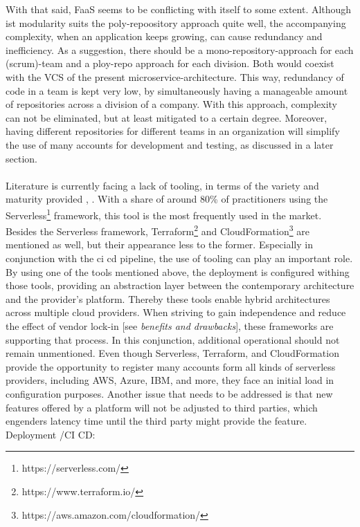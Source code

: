 \documentclass[11pt]{article}
\begin{document}
With that said, FaaS seems to be conflicting with itself to some extent. Although ist modularity suits the poly-repoository approach quite well, the accompanying complexity, when an application keeps growing, can cause redundancy and inefficiency. As a suggestion, there should be a mono-repository-approach for each (scrum)-team and a ploy-repo approach for each division. Both would coexist with the VCS of the present microservice-architecture. This way, redundancy of code in a team is kept very low, by simultaneously having a manageable amount of repositories across a division of a company. With this approach, complexity can not be eliminated, but at least mitigated to a certain degree. Moreover, having different repositories for different teams in an organization will simplify the use of many accounts for development and testing, as discussed in a later section. \\\\
Literature is currently facing a lack of tooling, in terms of the variety and maturity provided \cite{Yussupov2019_SystematicMappingStudyFaaS}, \cite{leitner2019mixed}. With a share of around 80\% \cite{leitner2019mixed} of practitioners using the Serverless\footnote{https://serverless.com/} framework, this tool is the most frequently used in the market. Besides the Serverless framework, Terraform\footnote{https://www.terraform.io/} and CloudFormation\footnote{https://aws.amazon.com/cloudformation/} are mentioned as well, but their appearance less to the former. Especially in conjunction with the ci cd pipeline, the use of tooling can play an important role. By using one of the tools mentioned above, the deployment is configured withing those tools, providing an abstraction layer between the contemporary architecture and the provider's platform. Thereby these tools enable hybrid architectures across multiple cloud providers. When striving to gain independence and reduce the effect of vendor lock-in [see \textit{benefits and drawbacks}], these frameworks are supporting that process. In this conjunction, additional operational should not remain unmentioned. Even though Serverless, Terraform, and CloudFormation provide the opportunity to register many accounts form all kinds of serverless providers, including AWS, Azure, IBM, and more, they face an initial load in configuration purposes. Another issue that needs to be addressed is that new features offered by a platform will not be adjusted to third parties, which engenders latency time until the third party might provide the feature. 
Deployment /CI CD: 
\end{document}
